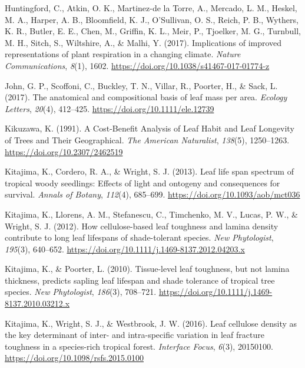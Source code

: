 \documentclass[
  12pt,
  a4paper,
,tablecaptionabove
]{scrartcl}
\newlength{\cslhangindent}
\newenvironment{CSLReferences}[2] %
 {%
  \setlength{\parindent}{0pt}
  \ifodd #1 \everypar{\setlength{\hangindent}{\cslhangindent}}\ignorespaces\fi
  \ifnum #2 > 0
  \setlength{\parskip}{#2\baselineskip}
  \fi
 }%
 {}
\begin{document}
\begin{CSLReferences}{1}{0}
\leavevmode{}%
Huntingford, C., Atkin, O. K., Martinez-de la Torre, A., Mercado, L. M.,
Heskel, M. A., Harper, A. B., Bloomfield, K. J., O'Sullivan, O. S.,
Reich, P. B., Wythers, K. R., Butler, E. E., Chen, M., Griffin, K. L.,
Meir, P., Tjoelker, M. G., Turnbull, M. H., Sitch, S., Wiltshire, A., \&
Malhi, Y. (2017). Implications of improved representations of plant
respiration in a changing climate. \emph{Nature Communications},
\emph{8}(1), 1602. \url{https://doi.org/10.1038/s41467-017-01774-z}

\leavevmode{}%
John, G. P., Scoffoni, C., Buckley, T. N., Villar, R., Poorter, H., \&
Sack, L. (2017). The anatomical and compositional basis of leaf mass per
area. \emph{Ecology Letters}, \emph{20}(4), 412--425.
\url{https://doi.org/10.1111/ele.12739}

\leavevmode{}%
Kikuzawa, K. (1991). A {Cost-Benefit Analysis} of {Leaf Habit} and {Leaf
Longevity} of {Trees} and {Their Geographical}. \emph{The American
Naturalist}, \emph{138}(5), 1250--1263.
\url{https://doi.org/10.2307/2462519}

\leavevmode{}%
Kitajima, K., Cordero, R. A., \& Wright, S. J. (2013). Leaf life span
spectrum of tropical woody seedlings: {Effects} of light and ontogeny
and consequences for survival. \emph{Annals of Botany}, \emph{112}(4),
685--699. \url{https://doi.org/10.1093/aob/mct036}

\leavevmode{}%
Kitajima, K., Llorens, A. M., Stefanescu, C., Timchenko, M. V., Lucas,
P. W., \& Wright, S. J. (2012). How cellulose-based leaf toughness and
lamina density contribute to long leaf lifespans of shade-tolerant
species. \emph{New Phytologist}, \emph{195}(3), 640--652.
\url{https://doi.org/10.1111/j.1469-8137.2012.04203.x}

\leavevmode{}%
Kitajima, K., \& Poorter, L. (2010). Tissue-level leaf toughness, but
not lamina thickness, predicts sapling leaf lifespan and shade tolerance
of tropical tree species. \emph{New Phytologist}, \emph{186}(3),
708--721. \url{https://doi.org/10.1111/j.1469-8137.2010.03212.x}

\leavevmode{}%
Kitajima, K., Wright, S. J., \& Westbrook, J. W. (2016). Leaf cellulose
density as the key determinant of inter- and intra-specific variation in
leaf fracture toughness in a species-rich tropical forest.
\emph{Interface Focus}, \emph{6}(3), 20150100.
\url{https://doi.org/10.1098/rsfs.2015.0100}


\end{CSLReferences}
\end{document}
